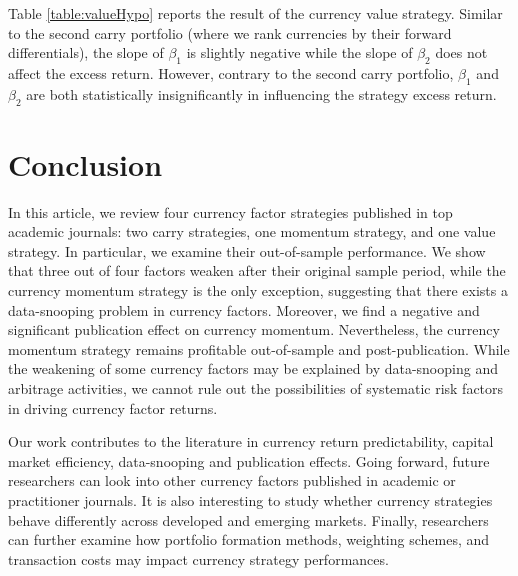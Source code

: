 \documentclass[12pt,a4paper]{article}
\begin{document}
Table \ref{table:valueHypo} reports the result of the currency value strategy. 
Similar to the second carry portfolio (where we rank currencies by their forward differentials),
the slope of $\beta_{1}$ is slightly negative while the slope of $\beta_{2}$ does not affect the excess return.
However, contrary to the second carry portfolio, $\beta_{1}$
and $\beta_{2}$ are both statistically insignificantly in influencing the strategy excess return.

\section{Conclusion}

In this article, we review four currency factor strategies published in top academic journals: two carry strategies, one momentum strategy, 
and one value strategy. In particular, we examine their out-of-sample performance. We show that three out of four factors weaken after their original sample period, while the currency momentum strategy is the only exception, suggesting that there exists a data-snooping problem in currency factors. 
Moreover, we find a negative and significant publication effect on currency momentum. Nevertheless, the currency momentum strategy remains profitable out-of-sample and post-publication. While the weakening of some currency factors may be explained by data-snooping and arbitrage activities, we cannot rule out the possibilities of systematic risk factors in driving currency factor returns.


Our work contributes to the literature in currency return predictability, capital market efficiency, data-snooping and publication effects. Going forward, future researchers can look into other currency factors published in academic or practitioner journals. It is also interesting to study whether currency strategies behave differently across developed and emerging markets. Finally, researchers can further examine how portfolio formation methods, weighting schemes, and transaction costs may impact currency strategy performances.

\newpage


\end{document}
